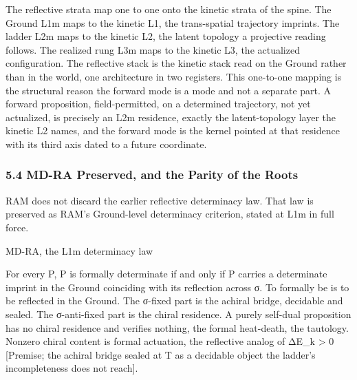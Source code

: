 \documentclass[10pt,twocolumn]{article}
\begin{document}
The reflective strata map one to one onto the kinetic strata of the
spine. The Ground L1m maps to the kinetic L1, the trans-spatial
trajectory imprints. The ladder L2m maps to the kinetic L2, the latent
topology a projective reading follows. The realized rung L3m maps to the
kinetic L3, the actualized configuration. The reflective stack is the
kinetic stack read on the Ground rather than in the world, one
architecture in two registers. This one-to-one mapping is the structural
reason the forward mode is a mode and not a separate part. A forward
proposition, field-permitted, on a determined trajectory, not yet
actualized, is precisely an L2m residence, exactly the latent-topology
layer the kinetic L2 names, and the forward mode is the kernel pointed
at that residence with its third axis dated to a future coordinate.

\hypertarget{md-ra-preserved-and-the-parity-of-the-roots}{%
\subsubsection{5.4 MD-RA Preserved, and the Parity of the
Roots}\label{md-ra-preserved-and-the-parity-of-the-roots}}

RAM does not discard the earlier reflective determinacy law. That law is
preserved as RAM's Ground-level determinacy criterion, stated at L1m in
full force.

\begin{jbox}{MD-RA, the L1m determinacy law}

For every P, P is formally determinate if and only if P carries a
determinate imprint in the Ground coinciding with its reflection across
σ. To formally be is to be reflected in the Ground. The σ-fixed part is
the achiral bridge, decidable and sealed. The σ-anti-fixed part is the
chiral residence. A purely self-dual proposition has no chiral residence
and verifies nothing, the formal heat-death, the tautology. Nonzero
chiral content is formal actuation, the reflective analog of ΔE\_k
\textgreater{} 0 {[}Premise; the achiral bridge sealed at T as a
decidable object the ladder's incompleteness does not reach{]}.

\end{jbox}
\end{document}
